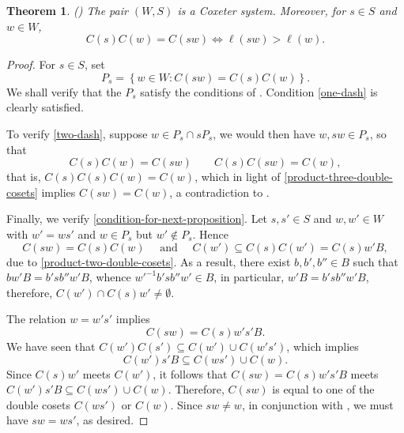 \documentclass{article}
\theoremstyle{thmstyle}
\newtheorem{theorem}{Theorem}[section]
\theoremstyle{defstyle}
\begin{document}
\begin{theorem}\big(\cite[2.3.7]{macdonald-spherical-functions}\big)
    The pair $(W, S)$ is a Coxeter system. Moreover, for $s\in S$ and $w\in W$, 
    \begin{equation*}
        C(s)C(w) = C(sw)\iff\ell(sw) > \ell(w).
    \end{equation*}
\end{theorem}
\begin{proof}
    For $s\in S$, set 
    \begin{equation*}
        P_s = \left\{w\in W\colon C(sw) = C(s)C(w)\right\}.
    \end{equation*}
    We shall verify that the $P_s$ satisfy the conditions of . Condition \ref{one-dash} is clearly satisfied. 

    To verify \ref{two-dash}, suppose $w\in P_s\cap sP_s$, we would then have $w, sw\in P_s$, so that 
    \begin{equation*}
        C(s)C(w) = C(sw)\qquad C(s)C(sw) = C(w),
    \end{equation*}
    that is, $C(s)C(s)C(w) = C(w)$, which in light of \eqref{product-three-double-cosets} implies $C(sw) = C(w)$, a contradiction to .

    Finally, we verify \ref{condition-for-next-proposition}. Let $s, s'\in S$ and $w,w'\in W$ with $w' = ws'$ and $w\in P_s$ but $w'\notin P_s$. Hence 
    \begin{equation*}
        C(sw) = C(s)C(w)\quad\text{ and }\quad C(w')\subseteq C(s)C(w') = C(s)w' B,
    \end{equation*}
    due to \ref{product-two-double-cosets}. As a result, there exist $b,b',b''\in B$ such that $bw'B = b'sb'' w'B$, whence $w'^{-1}b'sb''w'\in B$, in particular, $w'B = b'sb''w'B$, therefore, $C(w')\cap C(s)w'\ne\emptyset$.
    
    The relation $w = w's'$ implies 
    \begin{equation*}
        C(sw) = C(s)w's'B.
    \end{equation*}
    We have seen that $C(w')C(s')\subseteq C(w')\cup C(w's')$, which implies 
    \begin{equation*}
        C(w')s'B\subseteq C(ws')\cup C(w).
    \end{equation*}
    Since $C(s)w'$ meets $C(w')$, it follows that $C(sw) = C(s)w's'B$ meets $C(w')s'B\subseteq C(ws')\cup C(w)$. Therefore, $C(sw)$ is equal to one of the double cosets $C(ws')$ or $C(w)$. Since $sw\ne w$, in conjunction with , we must have $sw = ws'$, as desired.
\end{proof}
\end{document}
